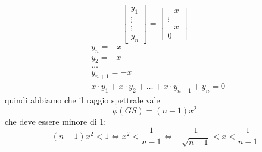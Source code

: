 \begin{example}
\begin{equation*}
\begin{bmatrix}
		y_1 \\ \vdots \\ \vdots \\ y_n
		\end{bmatrix} = 
		\begin{bmatrix}
		-x \\ \vdots \\ -x \\0
		\end{bmatrix}
	\end{equation*}
	\begin{equation*}
		\begin{split}
			& y_n = -x \\
			&y_2=-x \\
			& \ldots \\
			& y_{n+1}=-x \\
			& x\cdot y_1+x\cdot y_2+\ldots + x\cdot y_{n-1}+y_n = 0
		\end{split}
	\end{equation*}
	quindi abbiamo che il raggio spettrale vale
	\begin{equation*}
		\phi(GS) = (n-1)x^2
	\end{equation*}
	che deve essere minore di 1:
	\begin{equation*}
		(n-1)x^2 <1 \Leftrightarrow x^2<\frac{1}{n-1} \Leftrightarrow - \frac{1}{\sqrt{n-1}} < x < \frac{1}{n-1}
	\end{equation*}
\end{example}